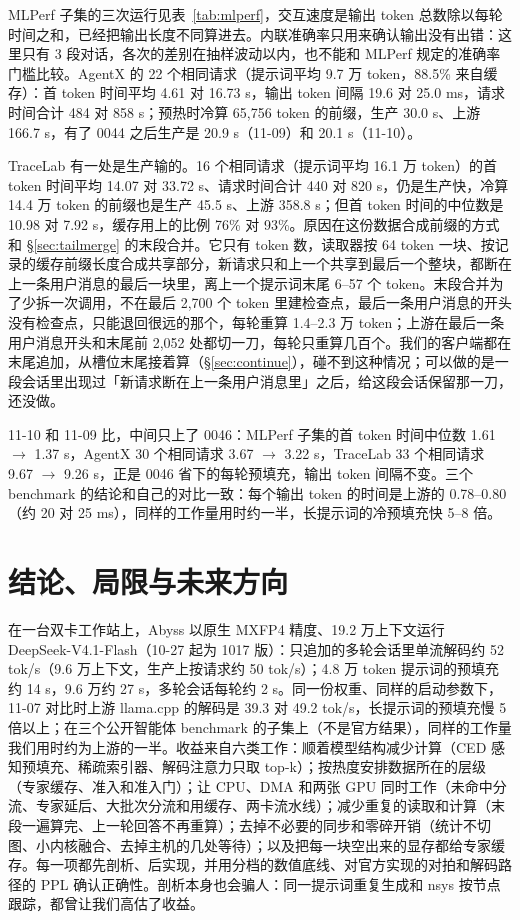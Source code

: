 \documentclass[11pt,a4paper]{article}
\newcommand{\tps}{tok/s}
\begin{document}
MLPerf 子集的三次运行见表~\ref{tab:mlperf}，交互速度是输出 token 总数除以每轮时间之和，已经把输出长度不同算进去。内联准确率只用来确认输出没有出错：这里只有 3 段对话，各次的差别在抽样波动以内，也不能和 MLPerf 规定的准确率门槛比较。AgentX 的 22 个相同请求（提示词平均 9.7 万 token，88.5\% 来自缓存）：首 token 时间平均 4.61 对 16.73 s，输出 token 间隔 19.6 对 25.0 ms，请求时间合计 484 对 858 s；预热时冷算 65,756 token 的前缀，生产 30.0 s、上游 166.7 s，有了 0044 之后生产是 20.9 s（11-09）和 20.1 s（11-10）。

TraceLab 有一处是生产输的。16 个相同请求（提示词平均 16.1 万 token）的首 token 时间平均 14.07 对 33.72 s、请求时间合计 440 对 820 s，仍是生产快，冷算 14.4 万 token 的前缀也是生产 45.5 s、上游 358.8 s；但首 token 时间的中位数是 10.98 对 7.92 s，缓存用上的比例 76\% 对 93\%。原因在这份数据合成前缀的方式和 \S\ref{sec:tailmerge} 的末段合并。它只有 token 数，读取器按 64 token 一块、按记录的缓存前缀长度合成共享部分，新请求只和上一个共享到最后一个整块，都断在上一条用户消息的最后一块里，离上一个提示词末尾 6--57 个 token。末段合并为了少拆一次调用，不在最后 2,700 个 token 里建检查点，最后一条用户消息的开头没有检查点，只能退回很远的那个，每轮重算 1.4--2.3 万 token；上游在最后一条用户消息开头和末尾前 2,052 处都切一刀，每轮只重算几百个。我们的客户端都在末尾追加，从槽位末尾接着算（\S\ref{sec:continue}），碰不到这种情况；可以做的是一段会话里出现过「新请求断在上一条用户消息里」之后，给这段会话保留那一刀，还没做。

11-10 和 11-09 比，中间只上了 0046：MLPerf 子集的首 token 时间中位数 1.61 $\to$ 1.37 s，AgentX 30 个相同请求 3.67 $\to$ 3.22 s，TraceLab 33 个相同请求 9.67 $\to$ 9.26 s，正是 0046 省下的每轮预填充，输出 token 间隔不变。三个 benchmark 的结论和自己的对比一致：每个输出 token 的时间是上游的 0.78--0.80（约 20 对 25 ms），同样的工作量用时约一半，长提示词的冷预填充快 5--8 倍。

\section{结论、局限与未来方向}

在一台双卡工作站上，Abyss 以原生 MXFP4 精度、19.2 万上下文运行 DeepSeek-V4.1-Flash（10-27 起为 1017 版）：只追加的多轮会话里单流解码约 52 \tps{}（9.6 万上下文，生产上按请求约 50 \tps{}）；4.8 万 token 提示词的预填充约 14 s，9.6 万约 27 s，多轮会话每轮约 2 s。同一份权重、同样的启动参数下，11-07 对比时上游 llama.cpp 的解码是 39.3 对 49.2 \tps{}，长提示词的预填充慢 5 倍以上；在三个公开智能体 benchmark 的子集上（不是官方结果），同样的工作量我们用时约为上游的一半。收益来自六类工作：顺着模型结构减少计算（CED 感知预填充、稀疏索引器、解码注意力只取 top-k）；按热度安排数据所在的层级（专家缓存、准入和准入门）；让 CPU、DMA 和两张 GPU 同时工作（未命中分流、专家延后、大批次分流和用缓存、两卡流水线）；减少重复的读取和计算（末段一遍算完、上一轮回答不再重算）；去掉不必要的同步和零碎开销（统计不切图、小内核融合、去掉主机的几处等待）；以及把每一块空出来的显存都给专家缓存。每一项都先剖析、后实现，并用分档的数值底线、对官方实现的对拍和解码路径的 PPL 确认正确性。剖析本身也会骗人：同一提示词重复生成和 nsys 按节点跟踪，都曾让我们高估了收益。
\end{document}
